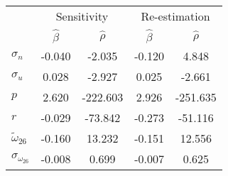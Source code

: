 \begin{tabular}{l*{4}{c}} \toprule 
& \multicolumn{2}{c}{Sensitivity} & \multicolumn{2}{c}{Re-estimation} \\ \cmidrule(lr){2-3} \cmidrule(lr){4-5}  
& $\hat{\beta}$ & $\hat{\rho}$ & $\hat{\beta}$ & $\hat{\rho}$ \\ \cmidrule(lr){2-5} 
  $\sigma_{n}$ & -0.040 & -2.035 & -0.120 & 4.848 \\ 
  $\sigma_{u}$ & 0.028 & -2.927 & 0.025 & -2.661 \\ 
  $p$ & 2.620 & -222.603 & 2.926 & -251.635 \\ 
  $r$ & -0.029 & -73.842 & -0.273 & -51.116 \\ 
  $\tilde{\omega}_{26}$ & -0.160 & 13.232 & -0.151 & 12.556 \\ 
  $\sigma_{\omega_{26}}$ & -0.008 & 0.699 & -0.007 & 0.625 \\ 
 \bottomrule 
 \end{tabular}